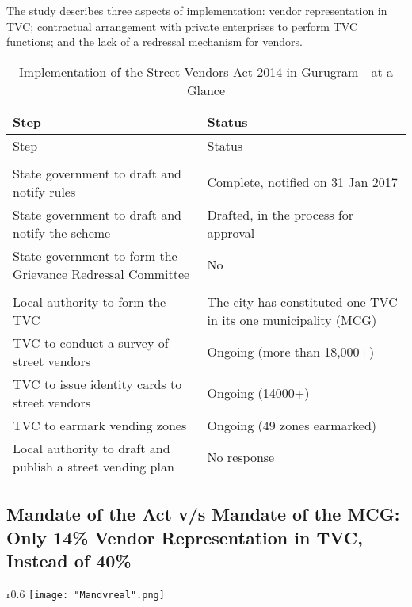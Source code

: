 \documentclass[a4paper, 12pt, twoside]{article}
\begin{document}
The study describes three aspects of implementation: vendor representation in TVC; contractual arrangement with private enterprises to perform TVC functions; and the lack of a redressal mechanism for vendors.
\begin{longtable}[l]{>{\raggedright}p{7cm}>{\raggedright\arraybackslash}p{7cm}}
  \caption{Implementation of the Street Vendors Act 2014 in Gurugram - at a Glance}\\
    \toprule
    Step & Status\\
    \midrule
    \endfirsthead
    \toprule
    Step & Status\\
    \midrule
    \endhead
    \bottomrule
    \endfoot
    \endlastfoot
    \multicolumn{2}{p{36.055em}}{Haryana} \\
    \midrule
    \rowcolor{SVACgreen2}State government to draft and notify rules & Complete, notified on 31 Jan 2017 \\
    \rowcolor{SVACyellow2} State government to draft and notify the scheme & Drafted, in the process for approval \\
    \rowcolor{SVACred2} State government to form the Grievance Redressal Committee & No \\
    \midrule
    \multicolumn{2}{p{36.055em}}{Gurugram}\\
    \midrule
    \rowcolor{SVACgreen2} Local authority to form the TVC & The city has constituted one TVC in its one municipality (MCG) \\
    \rowcolor{SVACyellow2} TVC to conduct a survey of street vendors & Ongoing (more than 18,000+) \\
    \rowcolor{SVACyellow2} TVC to issue identity cards to street vendors & Ongoing (14000+) \\
    \rowcolor{SVACyellow2}TVC to earmark vending zones & Ongoing (49 zones earmarked) \\
    \rowcolor{SVACred2} Local authority to draft and publish a street vending plan & No response \\
    \bottomrule
\end{longtable}

\subsection{Mandate of the Act v/s Mandate of the MCG: Only 14\% Vendor Representation in TVC, Instead of 40\%}

\begin{wrapfigure}{r}{0.6\textwidth}
\centering
\texttt{[image: "Mandvreal".png]}
\end{wrapfigure} 
\end{document}
